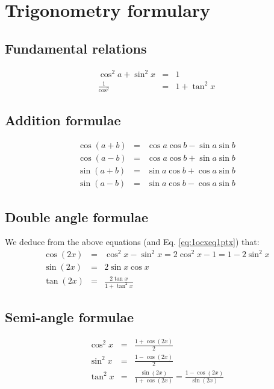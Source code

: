 \section{Trigonometry formulary}

  \subsection{Fundamental relations}

    \begin{eqnarray}
      \cos^2a + \sin^2x & = & 1 \label{eq:cos2sin2eq1} \\
      \frac{1}{\cos^2}  & = & 1 + \tan^2 x \label{eq:1ocxeq1ptx}
    \end{eqnarray}

  \subsection{Addition formulae}

  \begin{eqnarray}
    \cos(a + b) & = & \cos a \cos b - \sin a \sin b \label{eq:cosapb} \\
    \cos(a - b) & = & \cos a \cos b + \sin a \sin b \label{eq:cosamb} \\
    \sin(a + b) & = & \sin a \cos b + \cos a \sin b \label{eq:sinapb} \\
    \sin(a - b) & = & \sin a \cos b - \cos a \sin b \label{eq:sinamb}
  \end{eqnarray}

  \subsection{Double angle formulae}

  We deduce from the above equations (and Eq. \ref{eq:1ocxeq1ptx}) that:
  \begin{eqnarray}
    \cos(2x) & = & \cos^2 x - \sin^2 x = 2\cos^2 x - 1 = 1 - 2\sin^2 x \label{eq:cos2x} \\
    \sin(2x) & = & 2\sin x \cos x \label{eq:sin2x} \\
    \tan(2x) & = & \frac{2\tan x}{1 + \tan^2x} \label{eq:tan2x}
  \end{eqnarray}

  \subsection{Semi-angle formulae}

    \begin{eqnarray}
      \cos^2 x & = & \frac{1 + \cos(2x)}{2} \label{eq:cosx2} \\
      \sin^2 x & = & \frac{1 - \cos(2x)}{2} \label{eq:sinx2} \\
      \tan^2 x & = & \frac{\sin(2x)}{1 + \cos(2x)} = \frac{1 - \cos(2x)}{\sin(2x)} \label{eq:tanx2}
    \end{eqnarray}


